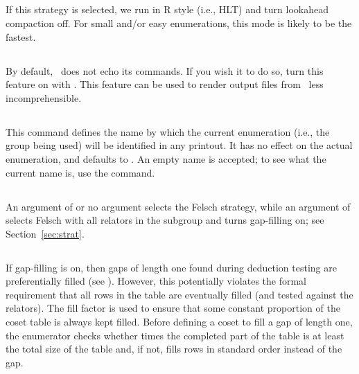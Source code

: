 \subsection{}

If this strategy is selected, we run in R style (i.e., HLT) and turn
  lookahead \amp compaction off.
For small and/or easy enumerations, this mode is likely to be the fastest.

\subsection{}

By default, \ace\ does not echo its commands.
If you wish it to do so, turn this feature on with .
This feature can be used to render output files from \ace\ less
  incomprehensible.

\subsection{}

This command defines the name by which the current enumeration (i.e.,
  the group being used) will be identified in any printout.
It has no effect on the actual enumeration, and defaults to .
An empty name is accepted; to see what the current name is, use the
   command.

\subsection{}

An argument of  or no argument selects the Felsch strategy, while
  an argument of  selects Felsch with all relators in the subgroup
  and turns gap-filling on; see Section~\ref{sec:strat}.

\subsection{}

If gap-filling is on, then gaps of length one found during deduction
  testing are preferentially filled (see \cite{Hav}).
However, this potentially violates the formal requirement that all rows
  in the table are eventually filled (and tested against the relators).
The fill factor is used to ensure that some constant proportion of the
  coset table is always kept filled.
Before defining a coset to fill a gap of length one, the enumerator checks 
  whether  times the completed part of the table is at least the
  total size of the table and, if not, fills rows in standard order
  instead of the gap.

